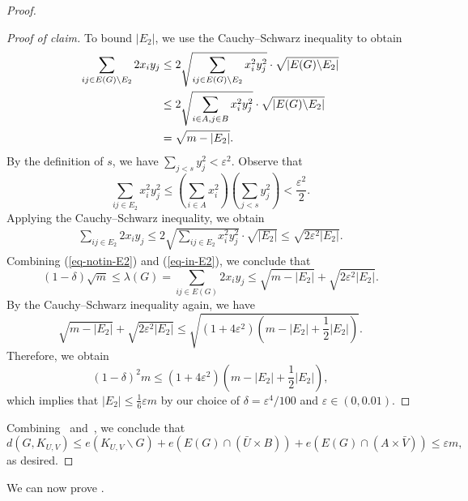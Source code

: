 \documentclass[11pt,a4paper]{article}
\theoremstyle{definition}
\theoremstyle{remark}
\newenvironment{poc}{\begin{proof}[Proof of claim]\renewcommand*{\qedsymbol}{$\blacksquare$}}{\end{proof}}
\newcommand*{\abs}[1]{\lvert#1\rvert}
\begin{document}
\begin{proof}
\begin{poc}
        To bound $|E_2|$, we use the Cauchy--Schwarz inequality to obtain
        \begin{align}
       \notag \sum_{ij \in E(G) \backslash E_2} 2x_i y_j  & \leq 2 \sqrt{\sum_{ij \in E(G) \backslash E_2} x_i^2 y_j^2} \cdot \sqrt{ |E(G) \backslash E_2| } \\ 
        & \leq 2 \sqrt{\sum_{i \in A, j \in B} x_i^2 y_j^2} \cdot \sqrt{|E(G) \backslash E_2|} \notag \\
        &= \sqrt{m - |E_2| }. \label{eq-notin-E2}
        \end{align}
        By the definition of $s$, we have $\sum_{j < s} y_j^2 < \varepsilon^2$. Observe that 
        $$\sum_{ij \in E_2} x_i^2 y_j^2 \leq \left(\sum_{i \in A} x_i^2\right) \left( \sum_{j < s} y_j^2 \right) < \frac{\varepsilon^2}{2}.$$
        Applying the Cauchy--Schwarz inequality, we obtain
        \begin{align} \label{eq-in-E2}
        \sum_{ij \in E_2} 2x_i y_j \leq 2 \sqrt{\sum_{ij \in E_2} x_i^2 y_j^2} \cdot \sqrt{\abs{E_2}} \leq \sqrt{2 \varepsilon^2 \abs{E_2}}.
        \end{align}
        Combining (\ref{eq-notin-E2}) and (\ref{eq-in-E2}), we conclude that 
        $$ 
        (1 - \delta) \sqrt{m} \le 
        \lambda(G) = \sum_{ij \in E(G)} 2x_i y_j 
        \le \sqrt{m - \abs{E_2}} + \sqrt{2 \varepsilon^2 \abs{E_2}}.$$
        By the Cauchy--Schwarz inequality again, we have
        $$\sqrt{m - \abs{E_2}} + \sqrt{2 \varepsilon^2 \abs{E_2}} \leq \sqrt{(1 + 4\varepsilon^2) \left(m - \abs{E_2} + \frac{1}{2}\abs{E_2}\right)}.$$
        Therefore, we obtain
        $$ (1 - \delta)^2 m\le 
        (1 + 4\varepsilon^2) \left(m - \abs{E_2} + \frac{1}{2}\abs{E_2} \right), $$
        which implies that $\abs{E_2} \leq \frac{1}{6} \varepsilon m $ by our choice of $\delta = \varepsilon^4 / 100$ and $\varepsilon \in (0, 0.01)$.
    \end{poc}
    Combining~ and~, we conclude that 
    $$d(G, K_{U, V}) \leq e(K_{U, V} \backslash G) + e(E(G) \cap (\bar{U} \times B)) + e(E(G) \cap (A \times \bar{V})) \leq \varepsilon m, $$ 
    as desired.
\end{proof}

We can now prove . 
\end{document}
